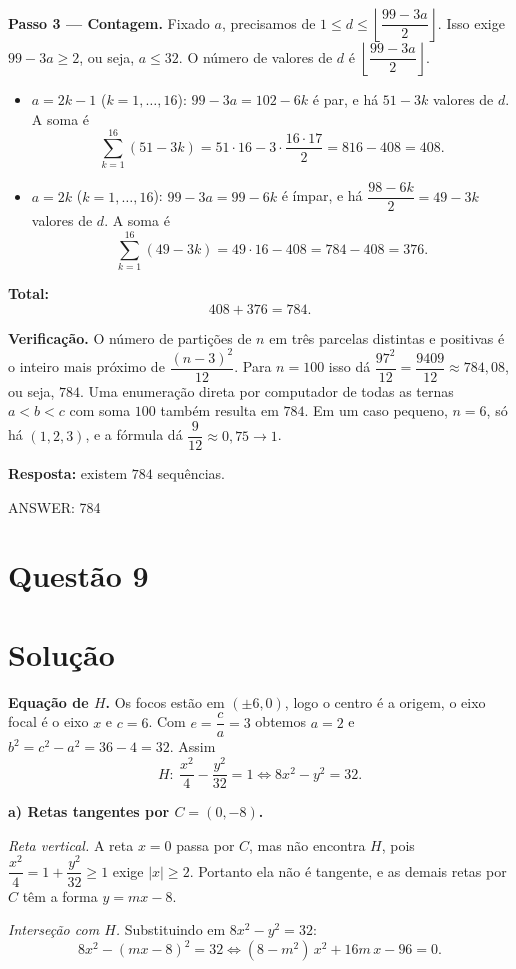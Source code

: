 \documentclass{article}%
\begin{document}
\textbf{Passo 3 — Contagem.} Fixado $a$, precisamos de $1\le d\le \left\lfloor \dfrac{99-3a}{2}\right\rfloor$. Isso exige $99-3a\ge 2$, ou seja, $a\le 32$. O número de valores de $d$ é $\left\lfloor \dfrac{99-3a}{2}\right\rfloor$.

\begin{itemize}
\item $a=2k-1$ ($k=1,\ldots,16$): $99-3a=102-6k$ é par, e há $51-3k$ valores de $d$. A soma é
\[
\sum_{k=1}^{16}(51-3k)=51\cdot 16-3\cdot\frac{16\cdot 17}{2}=816-408=408 .
\]
\item $a=2k$ ($k=1,\ldots,16$): $99-3a=99-6k$ é ímpar, e há $\dfrac{98-6k}{2}=49-3k$ valores de $d$. A soma é
\[
\sum_{k=1}^{16}(49-3k)=49\cdot 16-408=784-408=376 .
\]
\end{itemize}

\textbf{Total:}
\[
408+376=784 .
\]

\textbf{Verificação.} O número de partições de $n$ em três parcelas distintas e positivas é o inteiro mais próximo de $\dfrac{(n-3)^2}{12}$. Para $n=100$ isso dá $\dfrac{97^2}{12}=\dfrac{9409}{12}\approx 784{,}08$, ou seja, $784$. Uma enumeração direta por computador de todas as ternas $a<b<c$ com soma $100$ também resulta em $784$. Em um caso pequeno, $n=6$, só há $(1,2,3)$, e a fórmula dá $\dfrac{9}{12}\approx 0{,}75\to 1$.

\textbf{Resposta:} existem $784$ sequências.

ANSWER: 784%
\newpage%
\section*{Questão 9}

\section*{Solução}

\textbf{Equação de $H$.} Os focos estão em $(\pm 6,0)$, logo o centro é a origem, o eixo focal é o eixo $x$ e $c=6$. Com $e=\dfrac{c}{a}=3$ obtemos $a=2$ e $b^2=c^2-a^2=36-4=32$. Assim
\[
H:\ \frac{x^2}{4}-\frac{y^2}{32}=1 \iff 8x^2-y^2=32 .
\]

\textbf{a) Retas tangentes por $C=(0,-8)$.}

\emph{Reta vertical.} A reta $x=0$ passa por $C$, mas não encontra $H$, pois $\dfrac{x^2}{4}=1+\dfrac{y^2}{32}\ge 1$ exige $|x|\ge 2$. Portanto ela não é tangente, e as demais retas por $C$ têm a forma $y=mx-8$.

\emph{Interseção com $H$.} Substituindo em $8x^2-y^2=32$:
\[
8x^2-(mx-8)^2=32 \iff (8-m^2)\,x^2+16m\,x-96=0 . \tag{1}
\]
\end{document}

